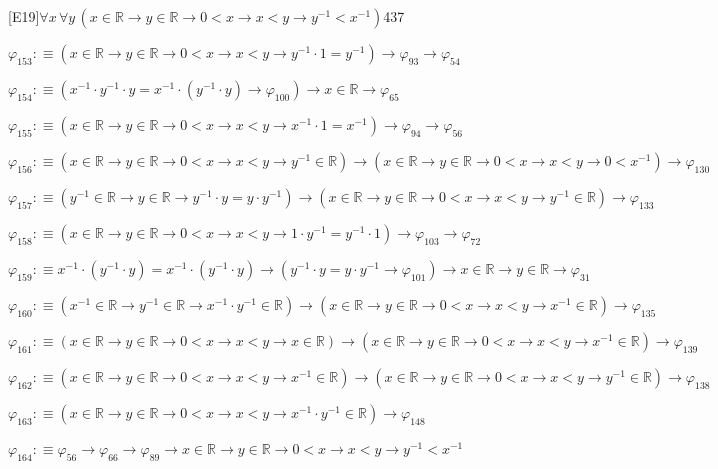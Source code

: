 \begin{fullproof}{[E19]}{$\forall x\,\forall y\,(x \in \mathbb{R} \to y \in \mathbb{R} \to 0 < x \to x < y \to y^{-1} < x^{-1})$}{437}
\begin{abbrevlist}
\item $\varphi_{153} :\equiv (x \in \mathbb{R} \to y \in \mathbb{R} \to 0 < x \to x < y \to y^{-1} \cdot 1 = y^{-1}) \to \varphi_{93} \to \varphi_{54}$
\item $\varphi_{154} :\equiv (x^{-1} \cdot y^{-1} \cdot y = x^{-1} \cdot (y^{-1} \cdot y) \to \varphi_{100}) \to x \in \mathbb{R} \to \varphi_{65}$
\item $\varphi_{155} :\equiv (x \in \mathbb{R} \to y \in \mathbb{R} \to 0 < x \to x < y \to x^{-1} \cdot 1 = x^{-1}) \to \varphi_{94} \to \varphi_{56}$
\item $\varphi_{156} :\equiv (x \in \mathbb{R} \to y \in \mathbb{R} \to 0 < x \to x < y \to y^{-1} \in \mathbb{R}) \to (x \in \mathbb{R} \to y \in \mathbb{R} \to 0 < x \to x < y \to 0 < x^{-1}) \to \varphi_{130}$
\item $\varphi_{157} :\equiv (y^{-1} \in \mathbb{R} \to y \in \mathbb{R} \to y^{-1} \cdot y = y \cdot y^{-1}) \to (x \in \mathbb{R} \to y \in \mathbb{R} \to 0 < x \to x < y \to y^{-1} \in \mathbb{R}) \to \varphi_{133}$
\item $\varphi_{158} :\equiv (x \in \mathbb{R} \to y \in \mathbb{R} \to 0 < x \to x < y \to 1 \cdot y^{-1} = y^{-1} \cdot 1) \to \varphi_{103} \to \varphi_{72}$
\item $\varphi_{159} :\equiv x^{-1} \cdot (y^{-1} \cdot y) = x^{-1} \cdot (y^{-1} \cdot y) \to (y^{-1} \cdot y = y \cdot y^{-1} \to \varphi_{101}) \to x \in \mathbb{R} \to y \in \mathbb{R} \to \varphi_{31}$
\item $\varphi_{160} :\equiv (x^{-1} \in \mathbb{R} \to y^{-1} \in \mathbb{R} \to x^{-1} \cdot y^{-1} \in \mathbb{R}) \to (x \in \mathbb{R} \to y \in \mathbb{R} \to 0 < x \to x < y \to x^{-1} \in \mathbb{R}) \to \varphi_{135}$
\item $\varphi_{161} :\equiv (x \in \mathbb{R} \to y \in \mathbb{R} \to 0 < x \to x < y \to x \in \mathbb{R}) \to (x \in \mathbb{R} \to y \in \mathbb{R} \to 0 < x \to x < y \to x^{-1} \in \mathbb{R}) \to \varphi_{139}$
\item $\varphi_{162} :\equiv (x \in \mathbb{R} \to y \in \mathbb{R} \to 0 < x \to x < y \to x^{-1} \in \mathbb{R}) \to (x \in \mathbb{R} \to y \in \mathbb{R} \to 0 < x \to x < y \to y^{-1} \in \mathbb{R}) \to \varphi_{138}$
\item $\varphi_{163} :\equiv (x \in \mathbb{R} \to y \in \mathbb{R} \to 0 < x \to x < y \to x^{-1} \cdot y^{-1} \in \mathbb{R}) \to \varphi_{148}$
\item $\varphi_{164} :\equiv \varphi_{56} \to \varphi_{66} \to \varphi_{89} \to x \in \mathbb{R} \to y \in \mathbb{R} \to 0 < x \to x < y \to y^{-1} < x^{-1}$

\end{abbrevlist}
\end{fullproof}
